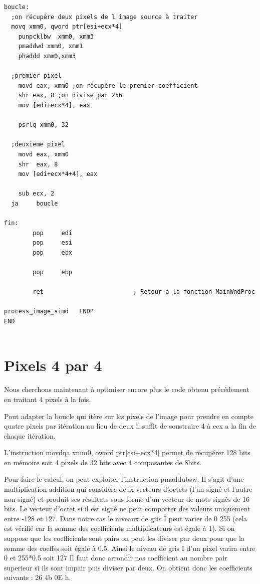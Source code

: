 \documentclass[11pt]{report}
\begin{document}
\begin{lstlisting}
boucle:
  ;on récupère deux pixels de l'image source à traiter
  movq xmm0, qword ptr[esi+ecx*4]
	punpcklbw  xmm0, xmm3
	pmaddwd xmm0, xmm1
	phaddd xmm0,xmm3

  ;premier pixel
	movd eax, xmm0 ;on récupère le premier coefficient
	shr eax, 8 ;on divise par 256
	mov [edi+ecx*4], eax

	psrlq xmm0, 32

  ;deuxieme pixel
	movd eax, xmm0
	shr  eax, 8
	mov [edi+ecx*4+4], eax

	sub ecx, 2
  ja     boucle

fin:
        pop     edi
        pop     esi
        pop     ebx

        pop     ebp

        ret                         ; Retour à la fonction MainWndProc

process_image_simd   ENDP
END


\end{lstlisting}


\section{Pixels 4 par 4}

Nous cherchons maintenant à optimiser encore plus le code obtenu précédement en traitant 4 pixels à la fois. 

Pout adapter la boucle qui itère sur les pixels de l’image pour prendre en compte quatre pixels par itération au lieu de deux il suffit de soustraire 4 à ecx a la fin de chaque itération.

L'instruction movdqa xmm0, oword ptr[esi+ecx*4] permet de récupérer 128 bits en mémoire soit 4 pixels de 32 bits avec 4 composantes de 8bits.

Pour faire le calcul, on peut exploiter l’instruction pmaddubsw. Il s’agit d’une multiplication-addition
qui considère deux vecteurs d’octets (l’un signé et l’autre non signé) et
produit ses résultats sous forme d’un vecteur de mots signés de 16 bits. Le vecteur d'octet si il est signé ne peut comporter des valeurs uniquement entre -128 et 127.
Dans notre cas le niveaux de gris I peut varier de 0 255 (cela est vérifié car la somme des coefficients multiplicateurs est égale à 1).
Si on suppose que les coefficients sont pairs on peut les diviser par deux pour que la somme des coeffss soit égale à 0.5.
Ainsi le niveau de gris I d'un pixel varira entre 0 et 255*0.5 soit 127
Il faut donc arrondir nos coefficient au nombre pair superieur si ils sont impair puis diviser par deux.
On obtient donc les coefficients suivants : 26 4b 0E h.
\end{document}
